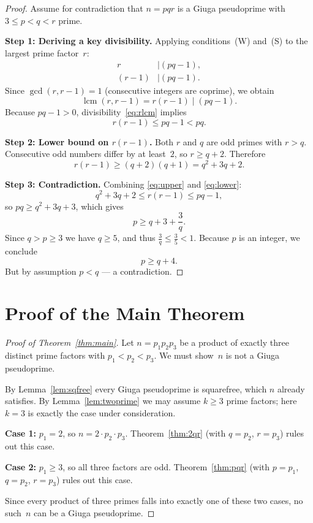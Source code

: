 \documentclass[12pt,a4paper]{amsart}
\theoremstyle{definition}
\DeclareMathOperator{\lcm}{lcm}
\begin{document}
\begin{proof}
Assume for contradiction that $n = pqr$ is a Giuga pseudoprime
with $3 \le p < q < r$ prime.

\medskip
\noindent\textbf{Step 1: Deriving a key divisibility.}
Applying conditions~(W) and~(S) to the largest prime factor~$r$:
\begin{align}
  r &\mid (pq - 1), \label{eq:rW} \\
  (r - 1) &\mid (pq - 1). \label{eq:rS}
\end{align}
Since $\gcd(r, r-1) = 1$ (consecutive integers are coprime), we obtain
\begin{equation}
  \lcm(r, r-1) = r(r-1) \mid (pq - 1).
  \label{eq:rlcm}
\end{equation}
Because $pq - 1 > 0$, divisibility~\eqref{eq:rlcm} implies
\begin{equation}
  r(r - 1) \le pq - 1 < pq.
  \label{eq:upper}
\end{equation}

\medskip
\noindent\textbf{Step 2: Lower bound on $r(r-1)$.}
Both $r$ and $q$ are odd primes with $r > q$.  Consecutive odd numbers differ
by at least~$2$, so $r \ge q + 2$.  Therefore
\begin{equation}
  r(r - 1) \ge (q + 2)(q + 1) = q^2 + 3q + 2.
  \label{eq:lower}
\end{equation}

\medskip
\noindent\textbf{Step 3: Contradiction.}
Combining \eqref{eq:upper} and \eqref{eq:lower}:
\[
  q^2 + 3q + 2 \le r(r-1) \le pq - 1,
\]
so $pq \ge q^2 + 3q + 3$, which gives
\[
  p \ge q + 3 + \frac{3}{q}.
\]
Since $q > p \ge 3$ we have $q \ge 5$, and thus
$\tfrac{3}{q} \le \tfrac{3}{5} < 1$.  Because $p$ is an integer, we conclude
\[
  p \ge q + 4.
\]
But by assumption $p < q$ — a contradiction.
\end{proof}

\section{Proof of the Main Theorem}

\begin{proof}[Proof of Theorem~\ref{thm:main}]
Let $n = p_1 p_2 p_3$ be a product of exactly three distinct prime factors
with $p_1 < p_2 < p_3$.  We must show~$n$ is not a Giuga pseudoprime.

By Lemma~\ref{lem:sqfree} every Giuga pseudoprime is squarefree, which $n$
already satisfies.  By Lemma~\ref{lem:twoprime} we may assume $k \ge 3$ prime
factors; here $k = 3$ is exactly the case under consideration.

\textbf{Case 1:} $p_1 = 2$, so $n = 2 \cdot p_2 \cdot p_3$.
Theorem~\ref{thm:2qr} (with $q = p_2$, $r = p_3$) rules out this case.

\textbf{Case 2:} $p_1 \ge 3$, so all three factors are odd.
Theorem~\ref{thm:pqr} (with $p = p_1$, $q = p_2$, $r = p_3$) rules out
this case.

Since every product of three primes falls into exactly one of these two cases,
no such~$n$ can be a Giuga pseudoprime.
\end{proof}
\end{document}
